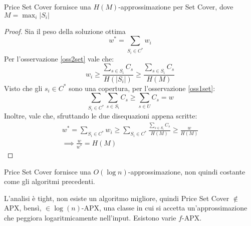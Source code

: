 \begin{theorem}
    Price Set Cover fornisce una $H(M)$-approssimazione per Set Cover, dove $M=\max_i|S_i|$
\end{theorem}
\begin{proof}
    Sia il peso della soluzione ottima $$w^* = \sum_{S_i \in C^*} w_i$$
    Per l'osservazione \ref{oss2set} vale che: 
    $$w_i \geq \frac{\sum_{s \in S_i}C_s}{H(|S_i|)} \geq \frac{\sum_{s \in S_i}C_s}{H(M)}$$
    Visto che gli $s_i \in C^*$ sono una copertura, per l'osservazione \ref{oss1set}:
    $$\sum_{S_i \in C^*}\sum_{s \in S_i}C_s \geq \sum_{s \in U} C_s = w$$
    Inoltre, vale che, sfruttando le due disequazioni appena scritte: 
    \begin{equation}
        \begin{aligned}
            w^* = \sum_{S_i \in C^*} w_i \geq \sum_{S_i \in C^*}\frac{\sum_{s \in S_i}C_s}{H(M)} \geq \frac{w}{H(M)}\\
            \implies \frac{w}{w^*} = H(M)
        \end{aligned}
    \end{equation}
\end{proof}
\begin{corollary}
    Price Set Cover fornisce una $O(\log n)$-approssimazione, non quindi costante 
    come gli algoritmi precedenti.
\end{corollary}
\begin{remark}
    L'analisi è tight, non esiste un algoritmo migliore, quindi
    Price Set Cover $\notin$ APX, bensì, $\in \log(n)$-APX, una classe in cui 
    si accetta un'approssimazione che peggiora logaritmicamente nell'input.
    Esistono varie $f$-APX.
\end{remark}
